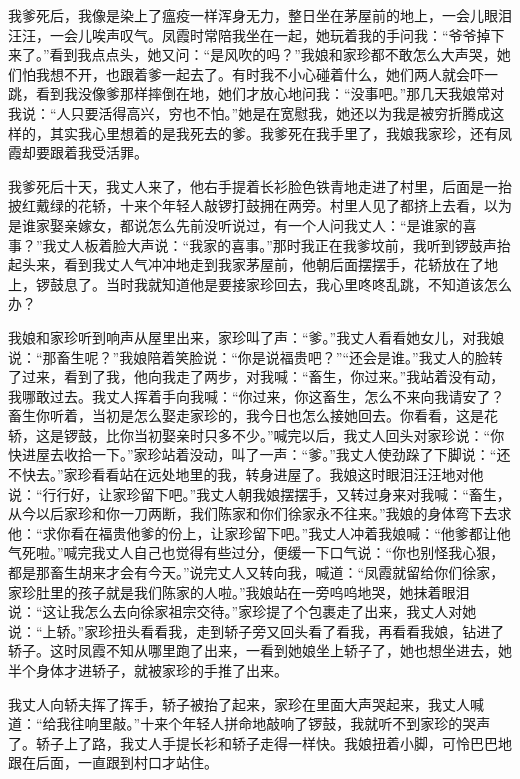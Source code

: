 \documentclass[12pt,UTF8]{ctexbook}
\begin{document}
我爹死后，我像是染上了瘟疫一样浑身无力，整日坐在茅屋前的地上，一会儿眼泪汪汪，一会儿唉声叹气。凤霞时常陪我坐在一起，她玩着我的手问我：“爷爷掉下来了。”看到我点点头，她又问：“是风吹的吗？”我娘和家珍都不敢怎么大声哭，她们怕我想不开，也跟着爹一起去了。有时我不小心碰着什么，她们两人就会吓一跳，看到我没像爹那样摔倒在地，她们才放心地问我：“没事吧。”那几天我娘常对我说：“人只要活得高兴，穷也不怕。”她是在宽慰我，她还以为我是被穷折腾成这样的，其实我心里想着的是我死去的爹。我爹死在我手里了，我娘我家珍，还有凤霞却要跟着我受活罪。

我爹死后十天，我丈人来了，他右手提着长衫脸色铁青地走进了村里，后面是一抬披红戴绿的花轿，十来个年轻人敲锣打鼓拥在两旁。村里人见了都挤上去看，以为是谁家娶亲嫁女，都说怎么先前没听说过，有一个人问我丈人：“是谁家的喜事？”我丈人板着脸大声说：“我家的喜事。”那时我正在我爹坟前，我听到锣鼓声抬起头来，看到我丈人气冲冲地走到我家茅屋前，他朝后面摆摆手，花轿放在了地上，锣鼓息了。当时我就知道他是要接家珍回去，我心里咚咚乱跳，不知道该怎么办？

我娘和家珍听到响声从屋里出来，家珍叫了声：“爹。”我丈人看看她女儿，对我娘说：“那畜生呢？”我娘陪着笑脸说：“你是说福贵吧？”“还会是谁。”我丈人的脸转了过来，看到了我，他向我走了两步，对我喊：“畜生，你过来。”我站着没有动，我哪敢过去。我丈人挥着手向我喊：“你过来，你这畜生，怎么不来向我请安了？畜生你听着，当初是怎么娶走家珍的，我今日也怎么接她回去。你看看，这是花轿，这是锣鼓，比你当初娶亲时只多不少。”喊完以后，我丈人回头对家珍说：“你快进屋去收拾一下。”家珍站着没动，叫了一声：“爹。”我丈人使劲跺了下脚说：“还不快去。”家珍看看站在远处地里的我，转身进屋了。我娘这时眼泪汪汪地对他说：“行行好，让家珍留下吧。”我丈人朝我娘摆摆手，又转过身来对我喊：“畜生，从今以后家珍和你一刀两断，我们陈家和你们徐家永不往来。”我娘的身体弯下去求他：“求你看在福贵他爹的份上，让家珍留下吧。”我丈人冲着我娘喊：“他爹都让他气死啦。”喊完我丈人自己也觉得有些过分，便缓一下口气说：“你也别怪我心狠，都是那畜生胡来才会有今天。”说完丈人又转向我，喊道：“凤霞就留给你们徐家，家珍肚里的孩子就是我们陈家的人啦。”我娘站在一旁呜呜地哭，她抹着眼泪说：“这让我怎么去向徐家祖宗交待。”家珍提了个包裹走了出来，我丈人对她说：“上轿。”家珍扭头看看我，走到轿子旁又回头看了看我，再看看我娘，钻进了轿子。这时凤霞不知从哪里跑了出来，一看到她娘坐上轿子了，她也想坐进去，她半个身体才进轿子，就被家珍的手推了出来。

我丈人向轿夫挥了挥手，轿子被抬了起来，家珍在里面大声哭起来，我丈人喊道：“给我往响里敲。”十来个年轻人拼命地敲响了锣鼓，我就听不到家珍的哭声了。轿子上了路，我丈人手提长衫和轿子走得一样快。我娘扭着小脚，可怜巴巴地跟在后面，一直跟到村口才站住。
\end{document}
